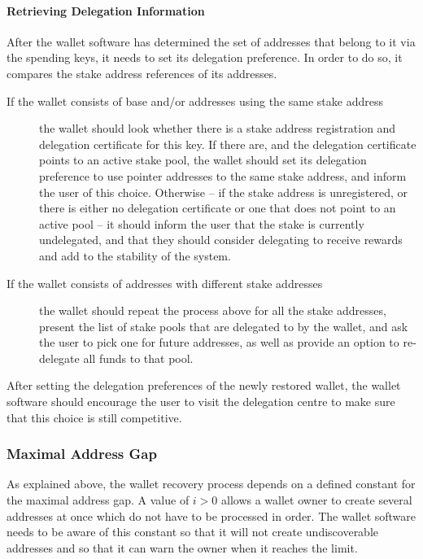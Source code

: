 \documentclass[11pt,a4paper,dvipsnames,twosided]{article}
\begin{document}
\paragraph{Retrieving Delegation Information}

After the wallet software has determined the set of addresses that
belong to it via the spending keys, it needs to set its delegation
preference. In order to do so, it compares the stake address references
of its addresses.

\begin{description}
\item[If the wallet consists of base and/or addresses using the same
  stake address] the wallet should look whether there is a stake address
  registration and delegation certificate for this key. If there are,
  and the delegation certificate points to an active stake pool, the
  wallet should set its delegation preference to use pointer addresses
  to the same stake address, and inform the user of this
  choice. Otherwise -- if the stake address is unregistered, or there is
  either no delegation certificate or one that does not point to an
  active pool -- it should inform the user that the stake is currently
  undelegated, and that they should consider delegating to receive
  rewards and add to the stability of the system.

\item[If the wallet consists of addresses with different stake addresses]
  the wallet should repeat the process above for all the stake addresses,
  present the list of stake pools that are delegated to by the wallet,
  and ask the user to pick one for future addresses, as well as
  provide an option to re-delegate all funds to that pool.
\end{description}

After setting the delegation preferences of the newly restored wallet,
the wallet software should encourage the user to visit the delegation
centre to make sure that this choice is still competitive.

\subsubsection{Maximal Address Gap}
\label{maximal-address-gap}

As explained above, the wallet recovery process depends on a defined
constant for the maximal address gap. A value of \(i>0\) allows a wallet
owner to create several addresses at once which do not have to be
processed in order. The wallet software needs to be aware of this
constant so that it will not create undiscoverable addresses and so that
it can warn the owner when it reaches the limit.
\end{document}
